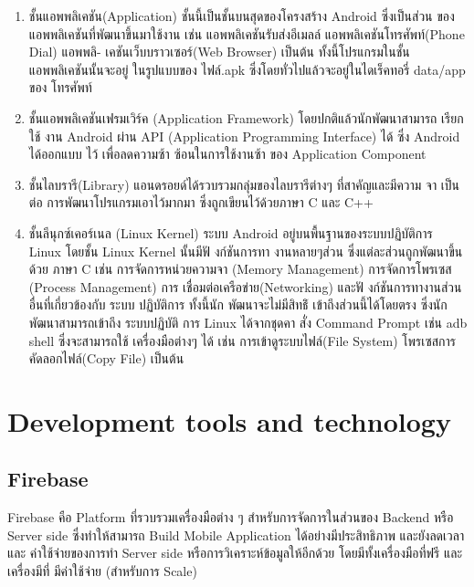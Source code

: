 \begin{enumerate}
    \item ชั้นแอพพลิเคชัน(Application) ชั้นนี้เป็นชั้นบนสุดของโครงสร้าง Android ซึ่งเป็นส่วน ของแอพพลิเคชันที่พัฒนาขึ้นมาใช้งาน เช่น แอพพลิเคชันรับส่งอีเมลล์ แอพพลิเคชันโทรศัพท์(Phone Dial) แอพพลิ-
    เคชันเว็บบราวเซอร์(Web Browser) เป็นต้น ทั้งนี้โปรแกรมในชั้น แอพพลิเคชันนั้นจะอยู่ ในรูปแบบของ
    ไฟล์.apk ซึ่งโดยทั่วไปแล้วจะอยู่ในไดเร็คทอรี่ data/app ของ โทรศัพท์
    
    \item ชั้นแอพพลิเคชันเฟรมเวิร์ค (Application Framework) โดยปกติแล้วนักพัฒนาสามารถ เรียกใช้
    งาน Android ผ่าน API (Application Programming Interface) ได้ ซึ่ง Android ได้ออกแบบ ไว้
    เพื่อลดความซ้า ซ้อนในการใช้งานซ้า ของ Application Component
    \item ชั้นไลบรารี(Library) แอนดรอยด์ได้รวบรวมกลุ่มของไลบรารีต่างๆ ที่สาคัญและมีความ จา เป็นต่อ
    การพัฒนาโปรแกรมเอาไว้มากมา ซึ่งถูกเขียนไว้ด้วยภาษา C และ C++

    \item ชั้นลีนุกซ์เคอร์เนล (Linux Kernel) ระบบ Android อยู่บนพื้นฐานของระบบปฏิบัติการ Linux
    โดยชั้น Linux Kernel นั้นมีฟั งก์ชันการทา งานหลายๆส่วน ซึ่งแต่ละส่วนถูกพัฒนาขึ้นด้วย ภาษา C เช่น
    การจัดการหน่วยความจา (Memory Management) การจัดการโพรเซส (Process Management) การ
    เชื่อมต่อเครือข่าย(Networking) และฟั งก์ชันการทางานส่วนอื่นที่เกี่ยวข้องกับ ระบบ ปฏิบัติการ ทั้งนี้นัก
    พัฒนาจะไม่มีสิทธ์ิ
    เข้าถึงส่วนนี้ได้โดยตรง ซึ่งนักพัฒนาสามารถเข้าถึง ระบบปฏิบัติ การ Linux ได้จากชุดคา
    สั่ง Command Prompt เช่น adb shell ซึ่งจะสามารถใช้ เครื่องมือต่างๆ ได้ เช่น การเข้าดูระบบไฟล์(File
    System) โพรเซสการคัดลอกไฟล์(Copy File) เป็นต้น
    
\end{enumerate}
\section{Development tools and technology}
\subsection{Firebase}
Firebase \cite{firebase} คือ Platform ที่รวบรวมเครื่องมือต่าง ๆ สําหรับการจัดการในส่วนของ Backend หรือ
Server side ซึ่งทําให้สามารถ Build Mobile Application ได้อย่างมีประสิทธิภาพ และยังลดเวลาและ
ค่าใช้จ่ายของการทํา Server side หรือการวิเคราะห์ข้อมูลให้อีกด้วย โดยมีทั้งเครื่องมือที่ฟรี และเครื่องมีที่
มีค่าใช้จ่าย (สําหรับการ Scale)

